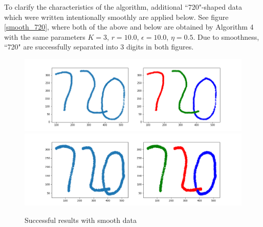 \documentclass[twoside,11pt]{article}
\begin{document}
To clarify the characteristics of the algorithm, additional ``720"-shaped data which were written intentionally smoothly are applied below.  See figure \ref{smooth_720}, where both of the above and below are obtained by Algorithm 4 with the same parameters $K = 3$, $r = 10.0$, $\epsilon = 10.0$, $\eta = 0.5$. Due to smoothness, ``720" are successfully separated into 3 digits in both figures.

\begin{figure}[htbp]
\centering
\vspace{-1em}
\includegraphics[width=0.8  \textwidth]{smooth_720_1.png}
\includegraphics[width=0.8  \textwidth]{smooth_720_2.png}
\vspace{-1em}
\caption{Successful results with smooth data}
\label{smooth_720_}
\end{figure}
\end{document}
